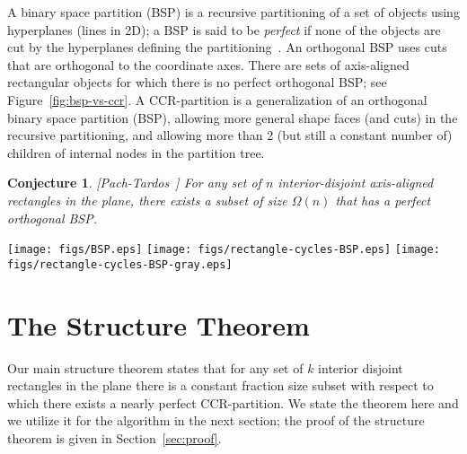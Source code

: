\documentclass{article}
\newtheorem{conjecture}{Conjecture}
\begin{document}
\medskip
{}\quad
A binary space partition (BSP) is a recursive partitioning of a set of
objects using hyperplanes (lines in 2D); a BSP is said to be {\em
  perfect} if none of the objects are cut by the hyperplanes defining
the partitioning~\cite{de1997perfect}.  An orthogonal BSP uses cuts
that are orthogonal to the coordinate axes. There are sets of
axis-aligned rectangular objects for which there is no perfect
orthogonal BSP; see Figure~\ref{fig:bsp-vs-ccr}.
%
A CCR-partition is a generalization of an orthogonal binary space
partition (BSP), allowing more general shape faces (and cuts) in the
recursive partitioning, and allowing more than 2 (but still a constant
number of) children of internal nodes in the partition tree.


\begin{conjecture}\label{conj}
[Pach-Tardos~\cite{pach2000cutting}] For any set of $n$ interior-disjoint axis-aligned rectangles in the plane, there exists a subset of size $\Omega(n)$ that has a perfect orthogonal BSP.
\end{conjecture}

\begin{figure*}[!ht]
	\centering
	\texttt{[image: figs/BSP.eps]}\hfill
       	\texttt{[image: figs/rectangle-cycles-BSP.eps]}\hfill
        \texttt{[image: figs/rectangle-cycles-BSP-gray.eps]}
	\caption{Left: A set of (gray) rectangles and a BSP that respects it. Middle: A set of (gray) rectangles that does not have a perfect BSP (but does have a perfect CCR-partition).
          Right: A perfect BSP partition of 3/4 of the rectangles in the middle figure (with 1/4 of the rectangles, in white, removed).}
	\label{fig:bsp-vs-ccr}
\end{figure*}


\section{The Structure Theorem}

Our main structure theorem states that for any set of $k$ interior disjoint
rectangles in the plane there is a constant fraction size %
subset with respect to which there exists a nearly perfect CCR-partition.
We state the theorem here and we utilize it for the algorithm in the next section;
the proof of the structure theorem is given in Section~\ref{sec:proof}.
\end{document}
